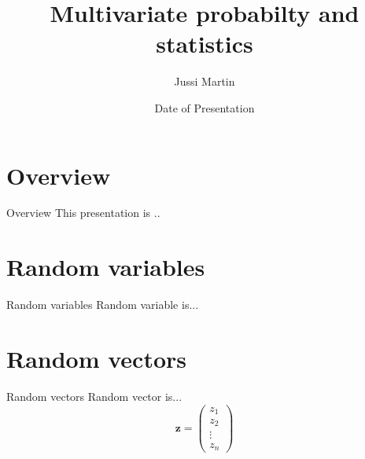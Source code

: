 \documentclass{beamer}
\title[Multivariate probabilty and statistics]{Multivariate probabilty and statistics}
\author{Jussi Martin}
\date{Date of Presentation}
\begin{document}
\begin{frame}
  \titlepage
\end{frame}


%
%
%
%
%

\section{Overview}

\begin{frame}{Overview}
  This presentation is ..
\end{frame}

\section{Random variables}

\begin{frame}{Random variables}
 Random variable is...
\end{frame}

\section{Random vectors}

\begin{frame}{Random vectors}
  Random vector is...
  \[ \mathbf{z} =  \begin{pmatrix} z_1 \\ z_2 \\ \vdots \\ z_n \end{pmatrix} \]
\end{frame}
\end{document}
